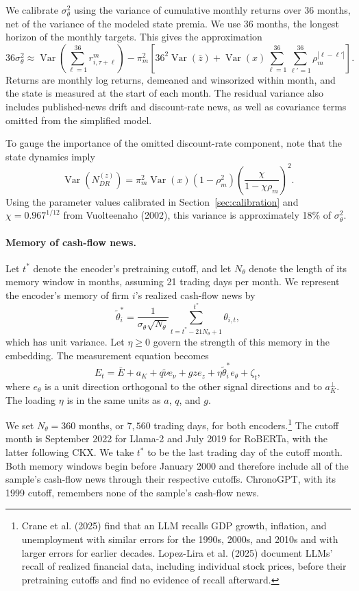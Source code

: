 \documentclass[11pt,letterpaper]{article}
\theoremstyle{remark}
\DeclareMathOperator{\Var}{Var}
\begin{document}
We calibrate $\sigma_\theta^2$ using the variance of cumulative monthly returns over 36 months, net of the variance of the modeled state premia. We use 36 months, the longest horizon of the monthly targets. This gives the approximation
\begin{equation}\label{eq:D23}
36\sigma_\theta^2\approx
\Var\left(\sum_{\ell=1}^{36}r^m_{i,\tau+\ell}\right)
-\pi_m^2\left[
36^2\Var(\bar z)
+\Var(x)\sum_{\ell=1}^{36}\sum_{\ell'=1}^{36}\rho_m^{|\ell-\ell'|}
\right].
\end{equation}
Returns are monthly log returns, demeaned and winsorized within month, and the state is measured at the start of each month. The residual variance also includes published-news drift and discount-rate news, as well as covariance terms omitted from the simplified model.

To gauge the importance of the omitted discount-rate component, note that the state dynamics imply
\[
\Var(N_{DR}^{(z)})
=\pi_m^2\Var(x)(1-\rho_m^2)
\left(\frac{\chi}{1-\chi\rho_m}\right)^2.
\]
Using the parameter values calibrated in Section~\ref{sec:calibration} and $\chi=0.967^{1/12}$ from Vuolteenaho (2002), this variance is approximately 18\% of $\sigma_\theta^2$.

\paragraph{Memory of cash-flow news.}
Let $t^\ast$ denote the encoder's pretraining cutoff, and let $N_\theta$ denote the length of its memory window in months, assuming 21 trading days per month. We represent the encoder's memory of firm $i$'s realized cash-flow news by
\[
\tilde\theta_i^\ast
=\frac{1}{\sigma_\theta\sqrt{N_\theta}}
\sum_{t=t^\ast-21N_\theta+1}^{t^\ast}\theta_{i,t},
\]
which has unit variance. Let $\eta\ge0$ govern the strength of this memory in the embedding. The measurement equation becomes
\[
E_t=\bar E+a_K+q\tilde\nu e_\nu+gz e_z
+\eta\tilde\theta_i^\ast e_\theta+\zeta_t,
\]
where $e_\theta$ is a unit direction orthogonal to the other signal directions and to $a_K^\perp$. The loading $\eta$ is in the same units as $a$, $q$, and $g$.

We set $N_\theta=360$ months, or $7{,}560$ trading days, for both encoders.\footnote{Crane et al. (2025) find that an LLM recalls GDP growth, inflation, and unemployment with similar errors for the 1990s, 2000s, and 2010s and with larger errors for earlier decades. Lopez-Lira et al. (2025) document LLMs' recall of realized financial data, including individual stock prices, before their pretraining cutoffs and find no evidence of recall afterward.}
The cutoff month is September 2022 for Llama-2 and July 2019 for RoBERTa, with the latter following CKX.
We take $t^\ast$ to be the last trading day of the cutoff month. Both memory windows begin before January 2000 and therefore include all of the sample's cash-flow news through their respective cutoffs. ChronoGPT, with its 1999 cutoff, remembers none of the sample's cash-flow news.
\end{document}
